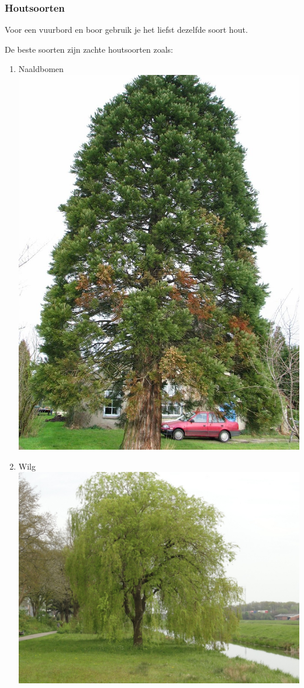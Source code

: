 \documentclass[a4paper, handout]{beamer}
\begin{document}
\begin{frame}
	\frametitle{Houtsoorten}
	Voor een vuurbord en boor gebruik je het liefst dezelfde soort hout.

	De beste soorten zijn zachte houtsoorten zoals:
	\begin{enumerate}
		\item{Naaldbomen}
		\includegraphics[scale=0.07]{naaldboom}
		\item{Wilg}
		\includegraphics[scale=0.08]{wilg}

\end{enumerate}
\end{frame}
\end{document}
